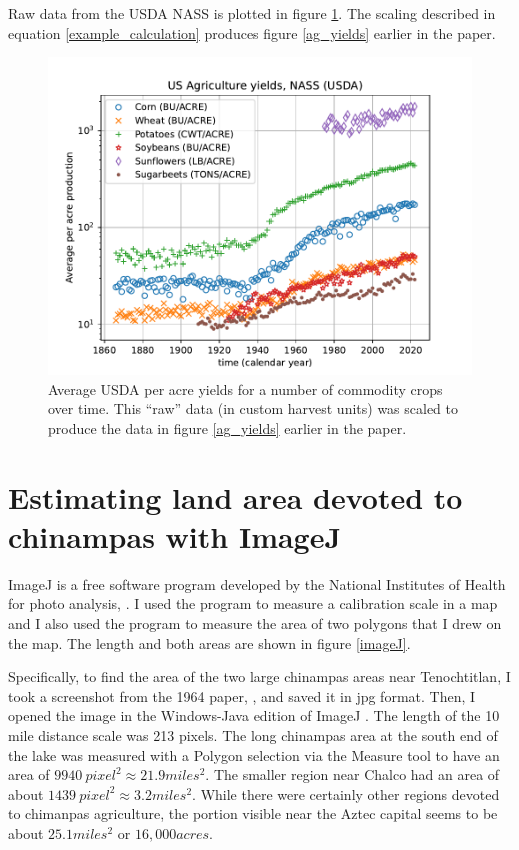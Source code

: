 \documentclass[prb,preprint]{revtex4-2}
\begin{document}
Raw data from the USDA NASS is plotted in figure \ref{raw_production_per_acre}.  The scaling described in equation \ref{example_calculation} produces figure \ref{ag_yields} earlier in the paper.
\begin{figure}[ht!]
\centering
\includegraphics[width=\columnwidth]{raw_production_per_acre.pdf}
\caption{
Average USDA per acre yields for a number of commodity crops over time.  This ``raw'' data (in custom harvest units) was scaled to produce the data in figure \ref{ag_yields} earlier in the paper. 
}
\label{raw_production_per_acre}
\end{figure}


\clearpage

\section{Estimating land area devoted to chinampas with ImageJ}
\label{appx_imageJ}

ImageJ is a free software program developed by the National Institutes of Health for photo analysis, \cite{imageJ}.  I used the program to measure a calibration scale in a map and I also used the program to measure the area of two polygons that I drew on the map.  The length and both areas are shown in figure \ref{imageJ}.

Specifically, to find the area of the two large chinampas areas near Tenochtitlan, I took a screenshot from the 1964 paper, \cite{Chinampas_1964}, and saved it in jpg format.  Then, I opened the image in the Windows-Java edition of ImageJ \cite{imageJ}.  The length of the 10 mile distance scale was 213 pixels. The long chinampas area at the south end of the lake was measured with a Polygon selection via the Measure tool to have an area of $9940~pixel^2\approx21.9miles^2$.  The smaller region near Chalco had an area of about $1439~pixel^2\approx3.2miles^2$.  While there were certainly other regions devoted to chimanpas agriculture, the portion visible near the Aztec capital seems to be about $25.1miles^2$ or $16,000acres$.  
\end{document}
